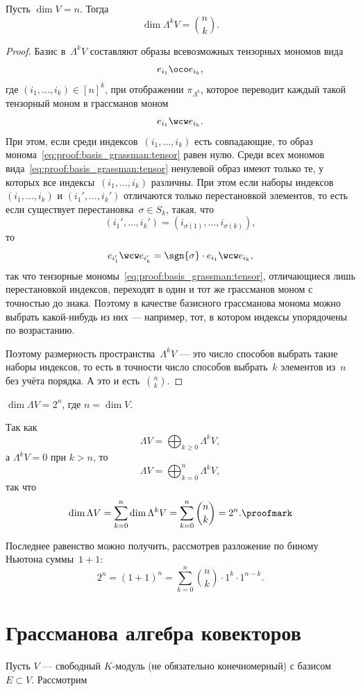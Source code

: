 \begin{lemma}
	Пусть $\dim{V} = n$. Тогда
	\[
		\dim{\Lambda^k V} = \binom{n}{k}
		.
	\]
\end{lemma}
\begin{proof}
	Базис в~$\Lambda^k V$ составляют образы всевозможных тензорных мономов вида
	\begin{equation}
		e_{i_1} \oco e_{i_k},
		\label{eq:proof:basis_grassman:tensor}
	\end{equation}
	где $(i_1, \dots, i_k) \in [n]^k$, при отображении $\pi_{\Lambda^k}$, которое переводит каждый такой тензорный моном в грассманов моном
	\[
		e_{i_1} \wcw e_{i_k}
		.
	\]
	При этом, если среди индексов~$(i_1, \dots, i_k)$ есть совпадающие, то образ монома~\eqref{eq:proof:basis_grassman:tensor} равен нулю. Среди всех мономов вида~\eqref{eq:proof:basis_grassman:tensor} ненулевой образ имеют только те, у которых все индексы~$(i_1, \dots, i_k)$ различны. При этом если наборы индексов~$(i_1, \dots, i_k)$ и $(i_1', \dots, i_k')$ отличаются только перестановкой элементов, то есть если существует перестановка~$\sigma \in S_k$, такая, что
	\[
		(i_1', \dots, i_k') = 
		(i_{\sigma(1)}, \dots, i_{\sigma(k)})
		,
	\]
	то
	\[
		e_{i_1'} \wcw e_{i_k'} =
		\sgn{\sigma}
		\cdot
		e_{i_1} \wcw e_{i_k}
		,
	\]
	так что тензорные мономы~\eqref{eq:proof:basis_grassman:tensor}, отличающиеся лишь перестановкой индексов, переходят в один и тот же грассманов моном с точностью до знака. Поэтому в качестве базисного грассманова монома можно выбрать какой-нибудь из них --- например, тот, в котором индексы упорядочены по возрастанию.

	Поэтому размерность пространства~$\Lambda^k V$ --- это число способов выбрать такие наборы индексов, то есть в точности число способов выбрать~$k$ элементов из~$n$ без учёта порядка. А это и есть~$\binom{n}{k}$.
\end{proof}

\begin{corrolary}
	$\dim{\Lambda V} = 2^n$, где $n = \dim V$.
\end{corrolary}
\begin{proofm}
	Так как
	\[
		\Lambda V =
		\bigoplus_{k \geq 0}
		\Lambda^k V
		,
	\]
	а $\Lambda^k V = 0$ при $k > n$, то
	\[
		\Lambda V =
		\bigoplus_{k = 0}^n
		\Lambda^k V
		,
	\]
	так что
	\[
		\dim{\Lambda V} =
		\sum_{k = 0}^n
			\dim{\Lambda^k V}
		=
		\sum_{k = 0}^n
			\binom{n}{k}
		=
		2^n
		.
		\proofmark
	\]
\end{proofm}

\begin{remark}
	Последнее равенство можно получить, рассмотрев разложение по биному Ньютона суммы~$1 + 1$:
	\[
		2^n = (1 + 1)^n =
		\sum_{k = 0}^n
			\binom{n}{k}
			\cdot 1^k \cdot 1^{n-k}
		.
	\]
\end{remark}

\section{Грассманова алгебра ковекторов}

Пусть $V$ --- свободный $K$-модуль (не обязательно конечномерный) с базисом~$E \subset V$. Рассмотрим 
